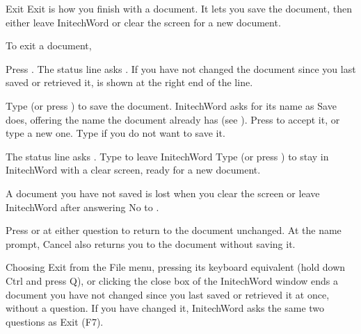 \begin{Feature}{Exit}
Exit is how you finish with a document.  It lets you save the document,
then either leave InitechWord or clear the screen for a new document.

To exit a document,
\begin{WPSteps}
\item Press .  The status line asks
.  If you have not changed the document since
you last saved or retrieved it,  is shown at
the right end of the line.
\item Type  (or press ) to save the document.  InitechWord
asks for its name as Save does, offering the name the document already has
(see ).  Press  to accept it, or type a new one.
\Or
Type  if you do not want to save it.
\item The status line asks .  Type  to leave
InitechWord
\Or
Type  (or press ) to stay in InitechWord with a clear
screen, ready for a new document.
\end{WPSteps}
\begin{Important}A document you have not saved is lost when you clear the
screen or leave InitechWord after answering No to .\end{Important}

\Notes
{}
Press  or  at either question to return to the
document unchanged.  At the name prompt, Cancel also returns you to the
document without saving it.

Choosing Exit from the File menu, pressing its keyboard equivalent
(hold down Ctrl and press Q), or clicking the close box of the InitechWord window ends a
document you have not changed since you last saved or retrieved it at once,
without a question.  If you have changed it, InitechWord asks the same two
questions as Exit (F7).


\end{Feature}
